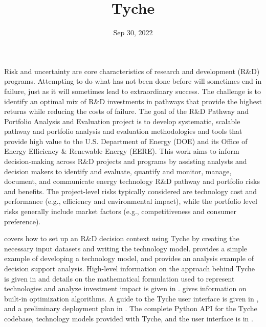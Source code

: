 \documentclass[letterpaper,10pt,english]{sphinxmanual}
\title{Tyche}
\date{Sep 30, 2022}
\author{}
\begin{document}
\pagestyle{empty}
\sphinxmaketitle
\pagestyle{plain}
\sphinxtableofcontents
\pagestyle{normal}
\label{\detokenize{index::doc}}


Risk and uncertainty are core characteristics of research and development (R\&D) programs. Attempting to do what has not been done before will sometimes end in failure, just as it will sometimes lead to extraordinary success. The challenge is to identify an optimal mix of R\&D investments in pathways that provide the highest returns while reducing the costs of failure. The goal of the R\&D Pathway and Portfolio Analysis and Evaluation project is to develop systematic, scalable pathway and portfolio analysis and evaluation methodologies and tools that provide high value to the U.S. Department of Energy (DOE) and its Office of Energy Efficiency \& Renewable Energy (EERE). This work aims to inform decision-making across R\&D projects and programs by assisting analysts and decision makers to identify and evaluate, quantify and monitor, manage, document, and communicate energy technology R\&D pathway and portfolio risks and benefits. The project-level risks typically considered are technology cost and performance (e.g., efficiency and environmental impact), while the portfolio level risks generally include market factors (e.g., competitiveness and consumer preference).

{\hyperref[\detokenize{cheat-sheet:sec-quickstart}]{}} covers how to set up an R\&D decision context using Tyche by creating the necessary input datasets and writing the technology model. {\hyperref[\detokenize{example-technology:sec-techmodelexample}]{}} provides a simple example of developing a technology model, and {\hyperref[\detokenize{example-analysis:sec-analysisexample}]{}} provides an analysis example of decision support analysis. High-level information on the approach behind Tyche is given in {\hyperref[\detokenize{approach:sec-approach}]{}} and details on the mathematical formulation used to represent technologies and analyze investment impact is given in {\hyperref[\detokenize{formulation:sec-formulation}]{}}. {\hyperref[\detokenize{optimizers:sec-optimizers}]{}} gives information on built-in optimization algorithms. A guide to the Tyche user interface is given in {\hyperref[\detokenize{user-interface:sec-userinterface}]{}}, and a preliminary deployment plan in {\hyperref[\detokenize{deployment:sec-deployment}]{}}. The complete Python API for the Tyche codebase, technology models provided with Tyche, and the user interface is in {\hyperref[\detokenize{modules:sec-modules}]{}}.
\end{document}
